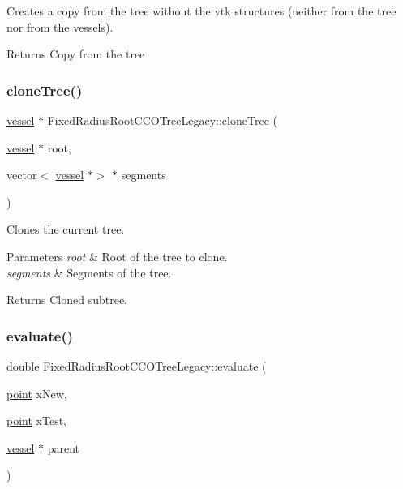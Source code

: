 Creates a copy from the tree without the vtk structures (neither from the tree nor from the vessels). \begin{DoxyReturn}{Returns}
Copy from the tree 
\end{DoxyReturn}
\mbox{\label{class_fixed_radius_root_c_c_o_tree_legacy_aa431d3484d8d4914ed6717bffe65de19}} 
\subsubsection{\texorpdfstring{clone\+Tree()}{cloneTree()}}
{\footnotesize\ttfamily \mbox{\hyperlink{structvessel}{vessel}} $\ast$ Fixed\+Radius\+Root\+C\+C\+O\+Tree\+Legacy\+::clone\+Tree (\begin{DoxyParamCaption}\item[{\mbox{\hyperlink{structvessel}{vessel}} $\ast$}]{root,  }\item[{vector$<$ \mbox{\hyperlink{structvessel}{vessel}} $\ast$$>$ $\ast$}]{segments }\end{DoxyParamCaption})\hspace{0.3cm}{\ttfamily [private]}}

Clones the current tree. 
\begin{DoxyParams}{Parameters}
{\em root} & Root of the tree to clone. \\
\hline
{\em segments} & Segments of the tree. \\
\hline
\end{DoxyParams}
\begin{DoxyReturn}{Returns}
Cloned subtree. 
\end{DoxyReturn}
\mbox{\label{class_fixed_radius_root_c_c_o_tree_legacy_a53a21d00d523d17ad2845954d625aab1}} 
\subsubsection{\texorpdfstring{evaluate()}{evaluate()}}
{\footnotesize\ttfamily double Fixed\+Radius\+Root\+C\+C\+O\+Tree\+Legacy\+::evaluate (\begin{DoxyParamCaption}\item[{\mbox{\hyperlink{structpoint}{point}}}]{x\+New,  }\item[{\mbox{\hyperlink{structpoint}{point}}}]{x\+Test,  }\item[{\mbox{\hyperlink{structvessel}{vessel}} $\ast$}]{parent }\end{DoxyParamCaption})\hspace{0.3cm}{\ttfamily [private]}}


